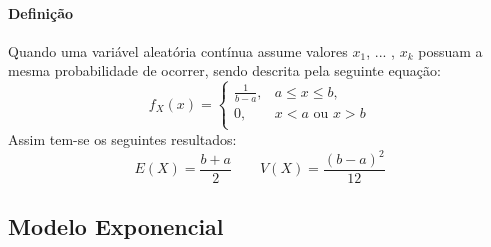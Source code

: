\documentclass{article}
\begin{document}
            \paragraph{Definição}Quando uma variável aleatória contínua assume valores $x_{1}$, ... , $x_{k}$ possuam a mesma probabilidade de ocorrer, sendo descrita pela seguinte equação:
                \begin{equation}
                    \boxed{
                        f_{X}(x) = 
                        \begin{cases}
                            \frac{1}{b-a}, & a \le x \le b,\\
                            0,             & x < a \text{ ou } x > b\\
                        \end{cases}
                    }
                \end{equation}
            Assim tem-se os seguintes resultados:
                \begin{equation}
                    \boxed{
                        E(X) = \frac{b+a}{2}
                    }
                    \qquad
                    \boxed{
                        V(X) = \frac{(b-a)^{2}}{12}
                    }
                \end{equation}

        \subsection{Modelo Exponencial}
\end{document}
